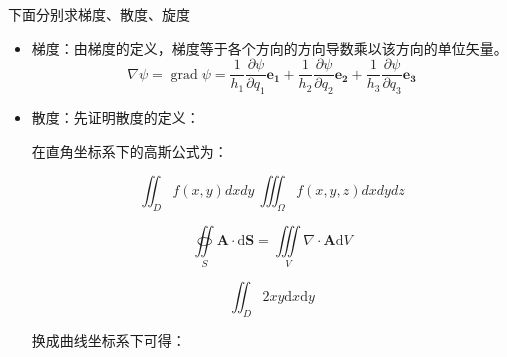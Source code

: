 \documentclass[UTF8]{ctexart}
\newcommand{\tmmathbf}[1]{\ensuremath{\boldsymbol{#1}}}
\newcommand{\tmop}[1]{\ensuremath{\operatorname{#1}}}
\begin{document}
下面分别求梯度、散度、旋度
\begin{itemize}

  \item
  梯度：由梯度的定义，梯度等于各个方向的方向导数乘以该方向的单位矢量。
  \begin{equation}
    \nabla \psi = \tmop{grad} \psi = \frac{1}{h_1} \frac{\partial
    \psi}{\partial q_1} \tmmathbf{e_1} + \frac{1}{h_2} \frac{\partial
    \psi}{\partial q_2} \tmmathbf{e_2} + \frac{1}{h_3} \frac{\partial
    \psi}{\partial q_3} \tmmathbf{e_3}
  \end{equation}
  \item 散度：先证明散度的定义：
  
  在直角坐标系下的高斯公式为：

\[\iint_{D}f(x,y)dxdy 
\
 \iiint_{\Omega}f(x,y,z)dxdydz  \]

\begin{equation}
\oiint \limits_{S} \mathbf{A} \cdot \mathrm{d}\mathbf{S} = 
\iiint \limits_{V} \nabla\cdot \mathbf{A} \mathrm{d}V
\end{equation}


\begin{equation}
\iint_{D} 2xy\mathrm{d}x\mathrm{d}y
\end{equation}


  换成曲线坐标系下可得：
  

\end{itemize}
\end{document}
